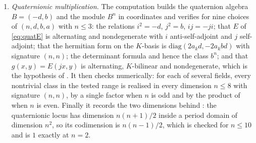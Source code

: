 \begin{enumerate}[label=\textup{(\Roman*)},leftmargin=*]
\item \emph{Quaternionic multiplication.} The computation builds the
  quaternion algebra $B=(-d,b)$ and the module $B^{n}$ in coordinates and
  verifies  for nine choices of $(n,d,b,a)$ with $n\le3$:
  the
  relations $i^{2}=-d$, $j^{2}=b$, $ij=-ji$; that $E$ of \eqref{eq:quatE} is
  alternating and nondegenerate with $i$ anti-self-adjoint and $j$
  self-adjoint; that the hermitian form on the $K$-basis is
  $\mathrm{diag}(2a_{k}d,-2a_{k}bd)$ with signature $(n,n)$; the determinant
  formula and hence the class $b^{n}$; and that $g(x,y)=E(jx,y)$ is
  alternating, $K$-bilinear and nondegenerate, which is the hypothesis of
  . It then checks  numerically:
  for each of several fields, every nontrivial class in the tested range is
  realised in every dimension $n\le8$ with signature $(n,n)$, by a single
  factor when $n$ is odd and by the product of  when $n$ is
  even. Finally it records the two dimensions behind : the
  quaternionic locus has dimension $n(n+1)/2$ inside a period domain of
  dimension $n^{2}$, so its codimension is $n(n-1)/2$, which is checked for
  $n\le10$ and is $1$ exactly at $n=2$.


\end{enumerate}
